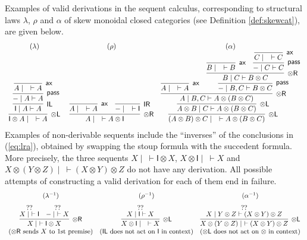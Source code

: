 \documentclass[submission,copyright,creativecommons]{eptcs}
\theoremstyle{definition}
\newcommand{\tl}{\otimes \mathsf{L}}
\newcommand{\tr}{\otimes \mathsf{R}}
\newcommand{\pass}{\mathsf{pass}}
\newcommand{\unitl}{\mathsf{IL}}
\newcommand{\unitr}{\mathsf{IR}}
\newcommand{\ax}{\mathsf{ax}}
\newcommand{\ot}{\otimes}
\newcommand{\I}{\mathsf{I}}
\begin{document}
Examples of valid derivations in the sequent calculus, corresponding to structural laws $\lambda$, $\rho$ and $\alpha$ of skew monoidal closed categories (see Definition \ref{def:skewcat}), are given below. %
\begin{equation}\label{eq:lra}
  \begin{array}{c@{\;\quad}cc}
  (\lambda) & (\rho) & (\alpha) \\
  \infer[\tl]{\I \ot A \mid \quad \vdash A}{
    \infer[\unitl]{\I \mid A \vdash A}{
      \infer[\pass]{- \mid A \vdash A}{
        \infer[\ax]{A \mid \quad \vdash A}{}
      }
    }
  }
  &
  \infer[\tr]{A \mid \quad \vdash A \ot \I}{
    \infer[\ax]{A \mid \quad \vdash A}{}
    &
    \infer[\unitr]{- \mid \quad \vdash \I}{}
  }
  &
  \infer[\tl]{(A \ot B) \ot C \mid \quad \vdash A \ot (B \ot C)}{
    \infer[\tl]{A \ot B \mid C \vdash A \ot (B \ot C)}{
      \infer[\tr]{A \mid B , C \vdash A \ot (B \ot C)}{
        \infer[\ax]{A \mid \quad \vdash A}{}
        &
        \infer[\pass]{- \mid B , C \vdash B \ot C}{
          \infer[\tr]{B \mid C \vdash B \ot C}{
            \infer[\ax]{B \mid \quad \vdash B}{}
            &
            \infer[\pass]{- \mid C \vdash C}{
              \infer[\ax]{C \mid \quad \vdash C}{}
            }
          }
        }
      }
    }
  }
  \end{array}
\end{equation}
Examples of non-derivable sequents include the ``inverses'' of the conclusions in (\ref{eq:lra}), obtained by swapping the stoup formula with the succedent formula.
More precisely, the three sequents $X \mid ~ \vdash \I \ot X$, $X \ot \I \mid ~ \vdash X$ and $X \ot (Y \ot Z) \mid ~ \vdash (X \ot Y) \ot Z$ do not have any derivation. All possible attempts of constructing a valid derivation for each of them end in failure.
\begin{displaymath}
  \begin{array}{ccc}
  (\lambda^{-1}) & (\rho^{-1}) & (\alpha^{-1}) \\[6pt]
    \infer[\tr]{X \mid ~\vdash \I \ot X}{
      \deduce[??]{X \mid ~ \vdash \I}{
      }
      &
      \deduce[??]{- \mid ~ \vdash X}{
      }
    }
    &
    \infer[\tl]{X \ot \I \mid \quad \vdash X}{
      \deduce{X \mid \I \vdash X}{??}
    }
    &
    \infer[\tl]{X \ot (Y \ot Z) \mid ~\vdash (X \ot Y) \ot Z}{
      \deduce{X \mid Y \ot Z \vdash (X \ot Y) \ot Z}{??}
    } \\
    (\text{$\tr$ sends $X$ to 1st premise}) &
    (\text{$\unitl$ does not act on $\I$ in context}) &
    (\text{$\tl$ does not act on $\ot$ in context})
  \end{array}
\end{displaymath}
\end{document}

